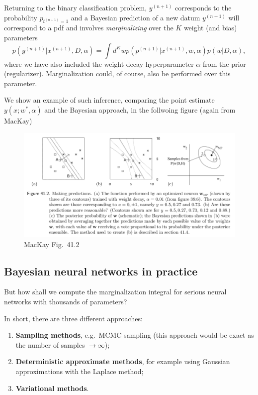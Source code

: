 \documentclass[%
oneside,                 %
final,                   %
10pt]{article}
\begin{document}
Returning to the binary classification problem, $y^{(n+1)}$ corresponds to the probability $p_{t^{(n+1)}=1}$ and a Bayesian prediction of a new datum $y^{(n+1)}$ will correspond to a pdf and involves \emph{marginalizing} over the $K$ weight (and bias) parameters
\[ p(y^{(n+1)} | x^{(n+1)}, D, \alpha) = \int d^K w p( p^{(n+1)} | x^{(n+1)}, w, \alpha) p(w|D,\alpha), \]
where we have also included the weight decay hyperparameter $\alpha$ from the prior (regularizer). Marginalization could, of course, also be performed over this parameter.

We show an example of such inference, comparing the point estimate $y(x; w^*, \alpha)$ and the Bayesian approach, in the follwoing figure (again from MacKay)


\begin{figure}[!ht]  %
  \centerline{\includegraphics[width=0.8\linewidth]{fig/MacKay_41_2.png}}
  \caption{
  MacKay Fig.~41.2
  }
\end{figure}


\subsection{Bayesian neural networks in practice}
But how shall we compute the marginalization integral for serious neural networks with thousands of parameters?

In short, there are three different approaches:

\begin{enumerate}
\item \textbf{Sampling methods}, e.g.~MCMC sampling (this approach would be exact as the number of samples $\rightarrow \infty$);

\item \textbf{Deterministic approximate methods}, for example using Gaussian approximations with the Laplace method;

\item \textbf{Variational methods}.
\end{enumerate}
\end{document}
